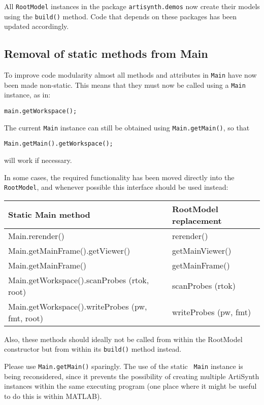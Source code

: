 \documentclass{article}
\begin{document}
All {\tt RootModel} instances in the package {\tt artisynth.demos} now
create their models using the {\tt build()} method. Code that depends
on these packages has been updated accordingly.

\subsection*{Removal of static methods from Main}


To improve code modularity almost all methods and attributes
in {\tt Main} have now been made non-static.  This means that they
must now be called using a {\tt Main} instance, as in:
%
\begin{lstlisting}[]
   main.getWorkspace();
\end{lstlisting}
%
The current {\tt Main} instance can still be obtained using
{\tt Main.getMain()}, so that 
%
\begin{lstlisting}[]
   Main.getMain().getWorkspace();
\end{lstlisting}
%
will work if necessary.

In some cases, the required functionality has been moved directly into
the {\tt RootModel}, and whenever possible this interface should be
used instead:

\begin{tabular}{|ll|}
\hline
Static Main method & RootModel replacement \\
\hline
Main.rerender() & rerender() \\
Main.getMainFrame().getViewer() &  getMainViewer() \\
Main.getMainFrame() &  getMainFrame() \\
Main.getWorkspace().scanProbes (rtok, root) & scanProbes (rtok) \\
Main.getWorkspace().writeProbes (pw, fmt, root) & writeProbes (pw, fmt) \\
\hline
\end{tabular}

Also, these methods should ideally not be called from within the
RootModel constructor but from within its {\tt build()} method
instead.

\begin{sideblock}
Please use {\tt Main.getMain()} sparingly. The use of the static {\tt
Main} instance is being reconsidered, since it prevents the
possibility of creating multiple ArtiSynth instances within the same
executing program (one place where it might be useful to do this is
within MATLAB).
\end{sideblock}
\end{document}
